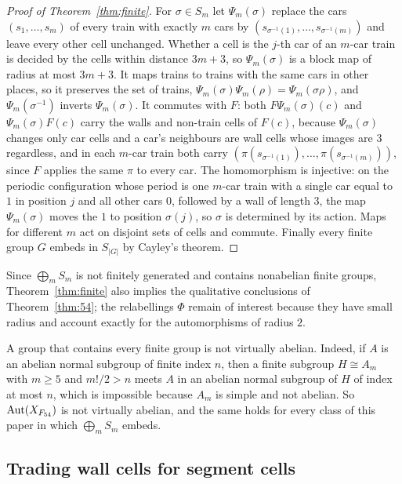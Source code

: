 \begin{proof}[Proof of Theorem~\ref{thm:finite}]
For $\sigma\in S_m$ let $\Psi_m(\sigma)$ replace the cars $(s_1,\dots,s_m)$ of every train with exactly $m$ cars by $(s_{\sigma^{-1}(1)},\dots,s_{\sigma^{-1}(m)})$ and leave every other cell unchanged. Whether a cell is the $j$-th car of an $m$-car train is decided by the cells within distance $3m+3$, so $\Psi_m(\sigma)$ is a block map of radius at most $3m+3$. It maps trains to trains with the same cars in other places, so it preserves the set of trains, $\Psi_m(\sigma)\Psi_m(\rho)=\Psi_m(\sigma\rho)$, and $\Psi_m(\sigma^{-1})$ inverts $\Psi_m(\sigma)$. It commutes with $F$: both $F\Psi_m(\sigma)(c)$ and $\Psi_m(\sigma)F(c)$ carry the walls and non-train cells of $F(c)$, because $\Psi_m(\sigma)$ changes only car cells and a car's neighbours are wall cells whose images are $3$ regardless, and in each $m$-car train both carry $(\pi(s_{\sigma^{-1}(1)}),\dots,\pi(s_{\sigma^{-1}(m)}))$, since $F$ applies the same $\pi$ to every car. The homomorphism is injective: on the periodic configuration whose period is one $m$-car train with a single car equal to $1$ in position $j$ and all other cars $0$, followed by a wall of length $3$, the map $\Psi_m(\sigma)$ moves the $1$ to position $\sigma(j)$, so $\sigma$ is determined by its action. Maps for different $m$ act on disjoint sets of cells and commute. Finally every finite group $G$ embeds in $S_{|G|}$ by Cayley's theorem.
\end{proof}

Since $\bigoplus_mS_m$ is not finitely generated and contains nonabelian finite groups, Theorem~\ref{thm:finite} also implies the qualitative conclusions of Theorem~\ref{thm:54}; the relabellings $\Phi$ remain of interest because they have small radius and account exactly for the automorphisms of radius $2$.

\begin{remark}\label{rem:notva}
A group that contains every finite group is not virtually abelian. Indeed, if $A$ is an abelian normal subgroup of finite index $n$, then a finite subgroup $H\cong A_m$ with $m\ge5$ and $m!/2>n$ meets $A$ in an abelian normal subgroup of $H$ of index at most $n$, which is impossible because $A_m$ is simple and not abelian. So $\operatorname{Aut}(X_{F_{54}})$ is not virtually abelian, and the same holds for every class of this paper in which $\bigoplus_mS_m$ embeds.
\end{remark}


\subsection{Trading wall cells for segment cells}\label{sec:tau}

